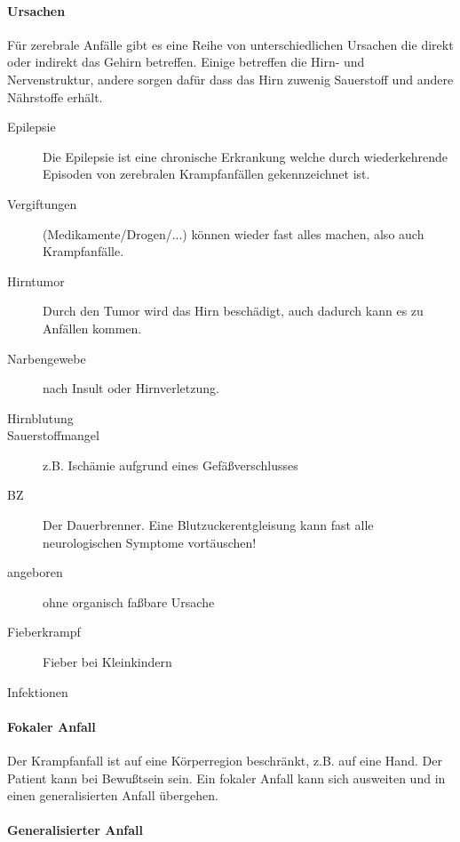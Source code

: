 \paragraph{Ursachen}

Für zerebrale Anfälle gibt es eine Reihe von unterschiedlichen Ursachen die
direkt oder indirekt das Gehirn betreffen. Einige betreffen die Hirn- und
Nervenstruktur, andere sorgen dafür dass das Hirn zuwenig Sauerstoff und andere
Nährstoffe erhält. 

\begin{description}
    \item[Epilepsie]Die Epilepsie ist eine chronische
    Erkrankung welche durch wiederkehrende Episoden von zerebralen Krampfanfällen gekennzeichnet ist.
    \item[Vergiftungen](Medikamente/Drogen/...) können wieder fast alles machen, also auch Krampfanfälle.
    \item[Hirntumor] Durch den Tumor wird das Hirn beschädigt, auch dadurch kann es zu Anfällen kommen.
    \item[Narbengewebe] nach Insult oder Hirnverletzung.
    \item[Hirnblutung]
    \item[Sauerstoffmangel] z.B. Ischämie aufgrund eines Gefäßverschlusses
    \item[BZ] Der Dauerbrenner. Eine Blutzuckerentgleisung kann fast alle neurologischen Symptome vortäuschen!
    \item[angeboren] ohne organisch fa{\ss}bare  Ursache
    \item[Fieberkrampf] Fieber bei Kleinkindern
    \item[Infektionen]
\end{description}

\paragraph{Fokaler Anfall}
Der Krampfanfall ist auf eine Körperregion beschränkt, z.B. auf eine Hand. Der Patient kann bei Bewußtsein sein.
       Ein fokaler Anfall kann sich ausweiten und in einen generalisierten Anfall übergehen. 
      


\paragraph{Generalisierter Anfall}

